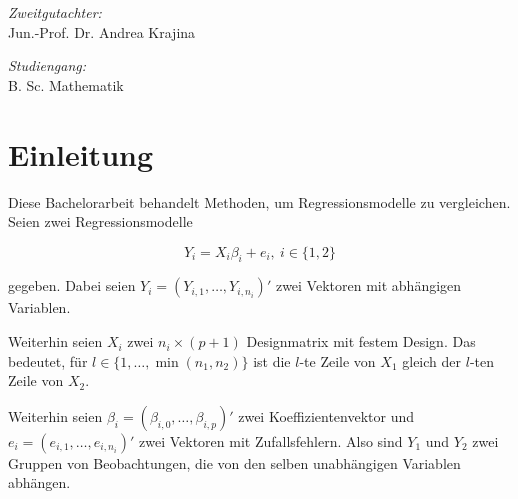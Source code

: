 \documentclass[12pt,a4paper]{article}
\theoremstyle{definition}
\theoremstyle{definition}
\theoremstyle{definition}
\theoremstyle{definition}
\begin{document}
\begin{titlepage}
\begin{center}
\begin{minipage}{0.4\textwidth}
\begin{flushleft}
\end{flushleft}
\end{minipage}
\hfill
\begin{minipage}{0.4\textwidth}
\begin{flushright} \large
\emph{Zweitgutachter:}\\
Jun.-Prof. Dr. Andrea Krajina\\
\end{flushright}
\end{minipage}
\begin{flushleft}
\begin{minipage}{0.4\textwidth}
\begin{flushleft} \large
\emph{Studiengang:}\\
B. Sc. Mathematik\\
\end{flushleft}
\end{minipage}
\end{flushleft}
\hfill


\end{center}

\newpage 
\thispagestyle{empty}
\quad 
\newpage
\end{titlepage}
\newpage

\tableofcontents
\newpage
\thispagestyle{empty}
\quad 


\section*{Einleitung}
Diese Bachelorarbeit behandelt Methoden, um Regressionsmodelle zu vergleichen. Seien zwei Regressionsmodelle 

\begin{equation*}
Y_i = X_i \beta_i + e_i ,~ i \in \{1,2\}
\end{equation*}

gegeben. Dabei seien $Y_i=(Y_{i,1}, \ldots, Y_{i,n_i})'$ zwei Vektoren mit abhängigen Variablen.
 
Weiterhin seien $X_i$ zwei $n_i \times (p+1)$ Designmatrix mit festem Design. Das bedeutet, für $l \in \{ 1, \ldots, \min(n_1, n_2)\}$ ist die $l$-te Zeile von $X_1$ gleich der $l$-ten Zeile von $X_2$.

Weiterhin seien $\beta_i = (\beta_{i,0}, \ldots, \beta_{i,p})'$ zwei Koeffizientenvektor und  $e_i = (e_{i,1}, \ldots, e_{i,n_i})'$ zwei Vektoren mit Zufallsfehlern. Also sind $Y_1$ und $Y_2$ zwei Gruppen von Beobachtungen, die von den selben unabhängigen Variablen abhängen. 
\end{document}
